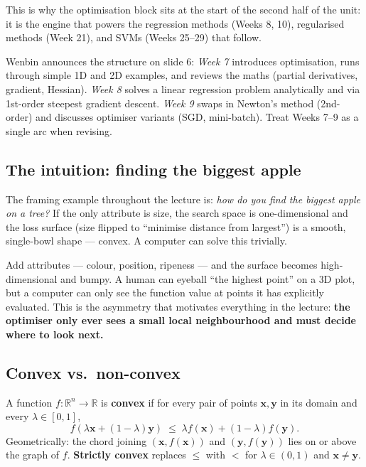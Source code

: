 \documentclass[11pt, a4paper]{article}
\begin{document}
This is why the optimisation block sits at the start of the second half of the unit: it is the engine that powers the regression methods (Weeks 8, 10), regularised methods (Week 21), and SVMs (Weeks 25--29) that follow.

\begin{notebox}
Wenbin announces the structure on slide 6: \emph{Week 7} introduces optimisation, runs through simple 1D and 2D examples, and reviews the maths (partial derivatives, gradient, Hessian). \emph{Week 8} solves a linear regression problem analytically and via 1st-order steepest gradient descent. \emph{Week 9} swaps in Newton's method (2nd-order) and discusses optimiser variants (SGD, mini-batch). Treat Weeks 7--9 as a single arc when revising.
\end{notebox}

\subsection{The intuition: finding the biggest apple}

The framing example throughout the lecture is: \emph{how do you find the biggest apple on a tree?} If the only attribute is size, the search space is one-dimensional and the loss surface (size flipped to ``minimise distance from largest'') is a smooth, single-bowl shape — convex. A computer can solve this trivially.

Add attributes — colour, position, ripeness — and the surface becomes high-dimensional and bumpy. A human can eyeball ``the highest point'' on a 3D plot, but a computer can only see the function value at points it has explicitly evaluated. This is the asymmetry that motivates everything in the lecture: \textbf{the optimiser only ever sees a small local neighbourhood and must decide where to look next.}

\subsection{Convex vs.\ non-convex}

\begin{defbox}
A function $f : \mathbb{R}^n \to \mathbb{R}$ is \textbf{convex} if for every pair of points $\mathbf{x}, \mathbf{y}$ in its domain and every $\lambda \in [0,1]$,
\[
f(\lambda \mathbf{x} + (1-\lambda)\mathbf{y}) \;\le\; \lambda f(\mathbf{x}) + (1-\lambda) f(\mathbf{y}).
\]
Geometrically: the chord joining $(\mathbf{x}, f(\mathbf{x}))$ and $(\mathbf{y}, f(\mathbf{y}))$ lies on or above the graph of $f$. \textbf{Strictly convex} replaces $\le$ with $<$ for $\lambda \in (0,1)$ and $\mathbf{x}\ne\mathbf{y}$.
\end{defbox}
\end{document}
